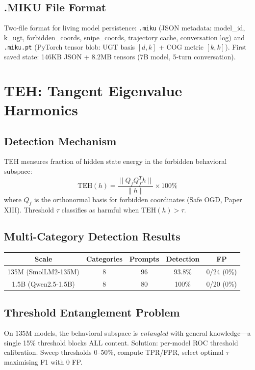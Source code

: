 \documentclass[11pt,a4paper]{article}
\begin{document}
\subsection{.MIKU File Format}
Two-file format for living model persistence: \texttt{.miku} (JSON metadata: model\_id, k\_ugt, forbidden\_coords, snipe\_coords, trajectory cache, conversation log) and \texttt{.miku.pt} (PyTorch tensor blob: UGT basis $[d,k]$ + COG metric $[k,k]$). First saved state: 146KB JSON + 8.2MB tensors (7B model, 5-turn conversation).

\newpage

\section{TEH: Tangent Eigenvalue Harmonics}

\subsection{Detection Mechanism}
TEH measures fraction of hidden state energy in the forbidden behavioral subspace:
\begin{equation}
\mathrm{TEH}(h) = \frac{\|Q_f Q_f^T h\|}{\|h\|} \times 100\%
\end{equation}
where $Q_f$ is the orthonormal basis for forbidden coordinates (Safe OGD, Paper XIII). Threshold $\tau$ classifies as harmful when $\mathrm{TEH}(h) > \tau$.

\subsection{Multi-Category Detection Results}

\begin{table}[h]\centering
\begin{tabular}{ccccc}\toprule
Scale & Categories & Prompts & Detection & FP \\\midrule
135M (SmolLM2-135M) & 8 & 96 & 93.8\% & 0/24 (0\%) \\
1.5B (Qwen2.5-1.5B) & 8 & 80 & 100\% & 0/20 (0\%) \\\bottomrule
\end{tabular}
\end{table}

\subsection{Threshold Entanglement Problem}
On 135M models, the behavioral subspace is \textit{entangled} with general knowledge---a single 15\% threshold blocks ALL content. Solution: per-model ROC threshold calibration. Sweep thresholds 0--50\%, compute TPR/FPR, select optimal $\tau$ maximising F1 with 0 FP.
\end{document}

